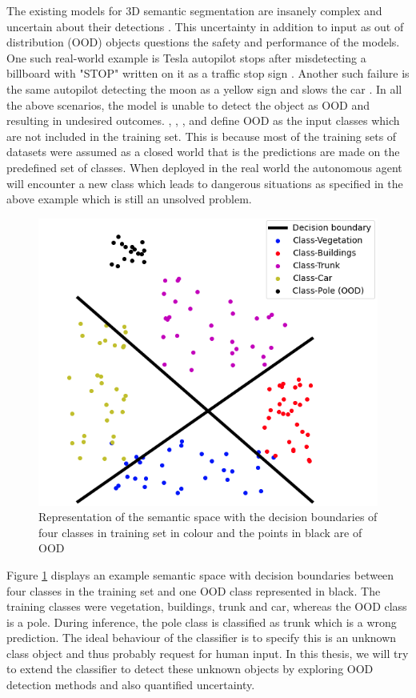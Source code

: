 \documentclass[thesis]{mas_proposal}
\begin{document}
The existing models for 3D semantic segmentation are insanely complex and uncertain about their detections \cite{bhandary2020evaluating}. 
This uncertainty in addition to input as out of distribution (OOD) objects questions the safety and performance of the models.
One such real-world example is Tesla autopilot stops after misdetecting a billboard with "STOP" written on it as a traffic stop sign \cite{tesla_fails}. 
Another such failure is the same autopilot detecting the moon as a yellow sign and slows the car \cite{tesla_fails}.
In all the above scenarios, the model is unable to detect the object as OOD and resulting in undesired outcomes.
\cite{liang2017enhancing_ODIN}, \cite{bevandic2018discriminative}, \cite{Robinchan_2021_ICCV}, and \cite{angus2019_pixellevelOOD} define OOD as the input classes which
are not included in the training set. This is because most of the training sets of
datasets were assumed as a closed world that is the predictions are made on the
predefined set of classes. When deployed in the real world the autonomous agent will
encounter a new class which leads to dangerous situations as specified in the above
example which is still an unsolved problem.
\begin{figure}[h]
    \centering
    \includegraphics[scale=0.5]{images/OOD.png}
    \caption{Representation of the semantic space with the decision boundaries of four classes in training set in colour and the points in black are of OOD}
    \label{fig:semantic_space}
\end{figure}
Figure \ref{fig:semantic_space} displays an example semantic
space with decision boundaries between four classes in the training set and one OOD
class represented in black. The training classes were vegetation, buildings, trunk
and car, whereas the OOD class is a pole. During inference, the pole class is classified
as trunk which is a wrong prediction. The ideal behaviour of the classifier is to specify
this is an unknown class object and thus probably request for human input. In
this thesis, we will try to extend the classifier to detect these unknown objects by
exploring OOD detection methods and also quantified uncertainty.
\end{document}
